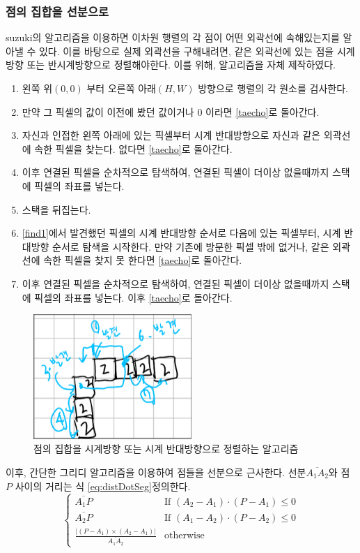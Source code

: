\documentclass[conference]{IEEEtran}
\begin{document}
\subsubsection{점의 집합을 선분으로}
suzuki의 알고리즘을 이용하면 이차원 행렬의 각 점이 어떤 외곽선에 속해있는지를 알아낼 수 있다.
이를 바탕으로 실제 외곽선을 구해내려면, 같은 외곽선에 있는 점을 시계방향 또는 반시계방향으로 정렬해야한다.
이를 위해, 알고리즘을 자체 제작하였다. 
\begin{enumerate}
    \item 왼쪽 위$(0, 0)$ 부터 오른쪽 아래$(H, W)$ 방향으로 행렬의 각 원소를 검사한다. \label{taecho}
    \item 만약 그 픽셀의 값이 이전에 봤던 값이거나 0 이라면 \ref{taecho}로 돌아간다.
    \item 자신과 인접한 왼쪽 아래에 있는 픽셀부터 시계 반대방향으로 자신과 같은 외곽선에 속한 픽셀을 찾는다. 없다면 \ref{taecho}로 돌아간다. \label{find1}
    \item 이후 연결된 픽셀을 순차적으로 탐색하여, 연결된 픽셀이 더이상 없을때까지 스택에 픽셀의 좌표를 넣는다.
    \item 스택을 뒤집는다.
    \item \ref{find1}에서 발견했던 픽셀의 시계 반대방향 순서로 다음에 있는 픽셀부터, 시계 반대방향 순서로 탐색을 시작한다.
    만약 기존에 방문한 픽셀 밖에 없거나, 같은 외곽선에 속한 픽셀을 찾지 못 한다면 \ref{taecho}로 돌아간다.
    \item 이후 연결된 픽셀을 순차적으로 탐색하여, 연결된 픽셀이 더이상 없을때까지 스택에 픽셀의 좌표를 넣는다. 이후 \ref{taecho}로 돌아간다.
\end{enumerate}
\begin{figure}
    \centering
    \includegraphics[width=6cm]{algo.png}
    \caption{점의 집합을 시계방향 또는 시계 반대방향으로 정렬하는 알고리즘}
\end{figure}
이후, 간단한 그리디 알고리즘을 이용하여 점들을 선분으로 근사한다.
선분$\overline{A_1A_2}$와 점 $P$ 사이의 거리는 식 \ref{eq:distDotSeg}\로 정의한다.
\begin{equation}
    \begin{cases}
        \overline{A_1P} & \text{If } (A_2 - A_1)\cdot (P - A_1) \leq 0 \\
        \overline{A_2P} & \text{If } (A_1 - A_2)\cdot(P - A_2) \leq 0 \\
        \frac{|(P - A_1)\times (A_2 - A_1)|}{\overline{A_1A_2}} & \text{otherwise}

    \end{cases}
    \label{eq:distDotSeg}
\end{equation}
\end{document}
